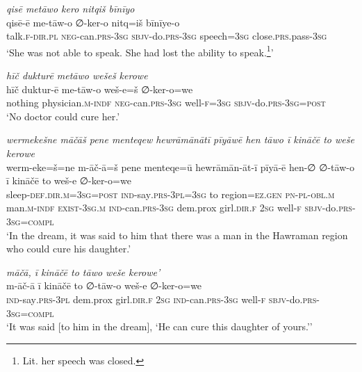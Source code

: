 \ea \label{ŽP.150}
\textit{qisē metāwo kero nitqiš bīnīyo} \\ 
\gll qisē-ē me-tāw-o ∅-ker-o nitq=iš bīnīye-o \\ 
 talk\textsc{.f}\textsc{-dir}\textsc{.pl} \textsc{neg-}can\textsc{.prs}\textsc{-3sg} \textsc{sbjv-}do\textsc{.prs}\textsc{-3sg} speech\textsc{=3sg} close\textsc{.prs}.pass\textsc{-3sg} \\ 
\glt `She was not able to speak. She had lost the ability to speak.\footnote{Lit. her speech was closed.}'
\z 
 
\ea \label{ŽP.152}
\textit{hīč dukturē metāwo wešeš kerowe} \\ 
\gll hīč duktur-ē me-tāw-o weš-e=š ∅-ker-o=we \\ 
 nothing physician\textsc{.m}\textsc{-indf} \textsc{neg-}can\textsc{.prs}\textsc{-3sg} well\textsc{-f}\textsc{=3sg} \textsc{sbjv-}do\textsc{.prs}\textsc{-3sg}\textsc{=\textsc{post}} \\ 
\glt `No doctor could cure her.'
\z 
 
\ea \label{ŽP.154}
\textit{wermekešne māčāš pene menteqew hewrāmānātī pīyāwē hen tāwo ī kināčē to weše kerowe} \\ 
\gll werm-eke=š=ne m-āč-ā=š pene menteqe=ū hewrāmān-āt-ī pīyā-ē hen-∅ ∅-tāw-o ī kināčē to weš-e ∅-ker-o=we \\ 
 sleep\textsc{-def}\textsc{.dir}\textsc{.m}\textsc{=3sg}\textsc{=\textsc{post}} \textsc{ind-}say\textsc{.prs}\textsc{-3pl}\textsc{=3sg} to region=\textsc{ez.gen} \textsc{pn}\textsc{\textsc{-pl}}\textsc{-obl}\textsc{.m} man\textsc{.m}\textsc{-indf} \textsc{exist}\textsc{-3sg}\textsc{.m} \textsc{ind-}can\textsc{.prs}\textsc{-3sg} dem.prox girl\textsc{.dir}\textsc{.f} \textsc{2sg} well\textsc{-f} \textsc{sbjv-}do\textsc{.prs}\textsc{-3sg}\textsc{=compl} \\ 
\glt `In the dream, it was said to him that there was a man in the Hawraman region who could cure his daughter.'
\z 
 
\ea \label{ŽP.156}
\textit{māčā, ī kināčē to tāwo weše kerowe’} \\ 
\gll m-āč-ā ī kināčē to ∅-tāw-o weš-e ∅-ker-o=we \\ 
 \textsc{ind-}say\textsc{.prs}\textsc{-3pl} dem.prox girl\textsc{.dir}\textsc{.f} \textsc{2sg} \textsc{ind-}can\textsc{.prs}\textsc{-3sg} well\textsc{-f} \textsc{sbjv-}do\textsc{.prs}\textsc{-3sg}\textsc{=compl} \\ 
\glt `It was said [to him in the dream], ‘He can cure this daughter of yours.’'
\z 
 
